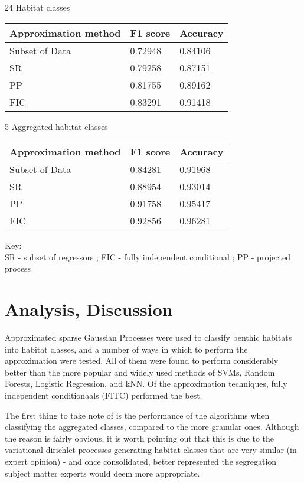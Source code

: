 \documentclass[10pt]{article}
\begin{document}
\begin{multicols}{2}
24 Habitat classes 

\begin{tabular}{| l | l | l |}
    \hline
    Approximation method    & F1 score & Accuracy \\\hline
    Subset of Data          & 0.72948 & 0.84106 \\
    SR                      & 0.79258 & 0.87151 \\
    PP                      & 0.81755 & 0.89162 \\
    FIC                     & 0.83291 & 0.91418 \\
    \hline
\end{tabular}

5 Aggregated habitat classes

\begin{tabular}{|l | l | l|}
    \hline
    Approximation method    & F1 score & Accuracy \\\hline
    Subset of Data          & 0.84281 & 0.91968 \\
    SR                      & 0.88954 & 0.93014 \\
    PP                      & 0.91758 & 0.95417 \\
    FIC                     & 0.92856 & 0.96281 \\
    \hline
\end{tabular}

Key:\\
SR - subset of regressors ; FIC - fully independent conditional ; PP - projected process

\section{Analysis, Discussion}
Approximated sparse Gaussian Processes were used to classify benthic habitats into habitat classes, and a number of ways in which to perform the approximation were tested. All of them were found to perform considerably better than the more popular and widely used methods of SVMs, Random Forests, Logistic Regression, and kNN. Of the approximation techniques, fully independent conditionaals (FITC) performed the best.

The first thing to take note of is the performance of the algorithms when classifying the aggregated classes, compared to the more granular ones. Although the reason is fairly obvious, it is worth pointing out that this is due to the variational dirichlet processes generating habitat classes that are very similar (in expert opinion) - and once consolidated, better represented the segregation subject matter experts would deem more appropriate.


\end{multicols}
\end{document}
